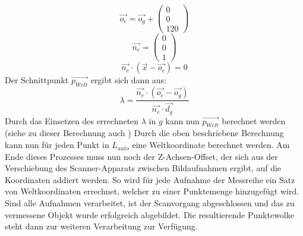 \begin{equation}
\vec{o_{e}} = \vec{o_{g}} + \left(\begin{array}{c}0\\0\\120\end{array}\right)
\end{equation}
\begin{equation}
\vec{n_{e}} = \left(\begin{array}{c}0\\0\\1\end{array}\right)
\end{equation}
\begin{equation}
\vec{n_{e}} \cdot (\vec{x} - \vec{o_{e}}) = 0
\end{equation}
Der Schnittpunkt \(\vec{p_{Welt}}\) ergibt sich dann aus:
\begin{equation}
\lambda = \frac{\vec{n_{e}} \cdot ( \vec{o_{e}} - \vec{o_{g}} ) }{ \vec{n_{e}} \cdot \vec{d_{g} }}
\end{equation}
Durch das Einsetzen des errechneten \(\lambda\) in \(g\) kann nun \(\vec{p_{Welt}}\) berechnet werden (siehe zu dieser Berechnung auch \cite{Kowdle})\bigbreak
Durch die oben beschriebene Berechnung kann nun für jeden Punkt in \(L_{auto}\) eine Weltkoordinate berechnet werden. Am Ende dieses Prozesses muss nun noch der Z-Achsen-Offset, der sich aus der Verschiebung des Scanner-Apparats zwischen Bildaufnahmen ergibt, auf die Koordinaten addiert werden. So wird für jede Aufnahme der Messreihe ein Satz von Weltkoordinaten errechnet, welcher zu einer Punktemenge hinzugefügt wird. Sind alle Aufnahmen verarbeitet, ist der Scanvorgang abgeschlossen und das zu vermessene Objekt wurde erfolgreich abgebildet. Die resultierende Punktewolke steht dann zur weiteren Verarbeitung zur Verfügung.

